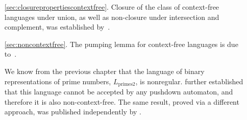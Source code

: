 \begin{enumerate}
\item[\ref{sec:closurepropertiescontextfree}.] Closure of the class of context-free languages under union, as well as non-closure under intersection and complement, was established by~\citet{Scheinberg1960BooleanPropertiesCFLs}.

\item[\ref{sec:noncontextfree}.] The pumping lemma for context-free languages is due to~\citet*{BarHillel1961FormalPropertiesPhraseStructureGrammars}.

We know from the previous chapter that the language of binary representations of prime numbers, $L_{\text{primes}2}$, is nonregular. \citet{HartmanisShank1968RecognitionPrimesAutomata} further established that this language cannot be accepted by any pushdown automaton, and therefore it is also non-context-free. The same result, proved via a different approach, was published independently by \citet{Schutzenberger1968RemarkAcceptableSets}.
\end{enumerate}